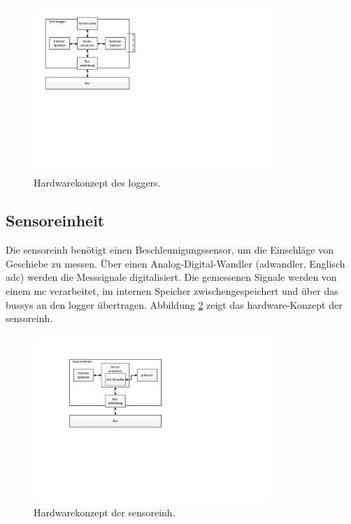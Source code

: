 \begin{figure}
	\centering
		\includegraphics[width=0.8\textwidth]{images/visio/hardwarekonzept_logger.pdf}
	\caption{Hardwarekonzept des \gls{logger}s.}
	\label{fig.hwkonzept_logger}
\end{figure}

\subsection{Sensoreinheit}
Die \gls{sensoreinh} benötigt einen Beschleunigungssensor, um die Einschläge von Geschiebe zu messen. Über einen Analog-Digital-Wandler (\gls{adwandler}, Englisch \gls{adc}) werden die Messsignale digitalisiert. Die gemessenen Signale werden von einem \gls{mc} verarbeitet, im internen Speicher zwischengespeichert und über das \gls{bussys} an den \gls{logger} übertragen. Abbildung \ref{fig.hwkonzept_sensor} zeigt das \gls{hardware}-Konzept der \gls{sensoreinh}.

\begin{figure}
	\centering
		\includegraphics[width=0.8\textwidth]{images/visio/hardwarekonzept_sensor.pdf}
	\caption{Hardwarekonzept der \gls{sensoreinh}.}
	\label{fig.hwkonzept_sensor}
\end{figure}


